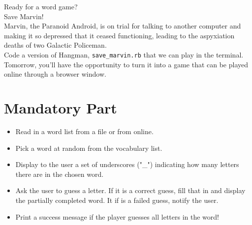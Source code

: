 \documentclass{42-en}
\begin{document}
Ready for a word game?\\

Save Marvin!\\

Marvin, the Paranoid Android, is on trial for talking to another computer and making it so depressed that it ceased functioning, leading to the aspyxiation deaths of two Galactic Policeman.\\

Code a version of Hangman, \texttt{save\_marvin.rb} that we can play in the terminal. Tomorrow, you'll have the opportunity to turn it into a game that can be played online through a browser window.\\


\chapter{Mandatory Part}

\begin{itemize}

\item Read in a word list from a file or from online.
\item Pick a word at random from the vocabulary list.
\item Display to the user a set of underscores ("\_") indicating how many letters there are in the chosen word.
\item Ask the user to guess a letter. If it is a correct guess, fill that in and display the partially completed word. It if is a failed guess, notify the user.
\item Print a success message if the player guesses all letters in the word!

\end{itemize}

\end{document}
